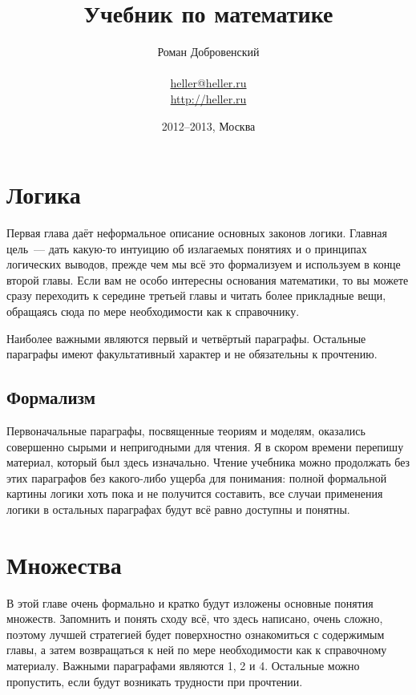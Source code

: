 \documentclass[a5paper,10pt,pagesize,DIV=classic]{scrbook}
\theoremstyle{plain}
\theoremstyle{definition}
\begin{document}
\title{Учебник по математике}
\author{Роман Добровенский\\ \\ \url{heller@heller.ru}\\ \url{http://heller.ru}}
\date{2012--2013, Москва}
\maketitle

\tableofcontents



\chapter{Логика}
Первая глава даёт неформальное описание основных законов логики. Главная цель~--- дать какую-то интуицию об излагаемых понятиях и о принципах логических выводов, прежде чем мы всё это формализуем и используем в конце второй главы. Если вам не особо интересны основания математики, то вы можете сразу переходить к середине третьей главы и читать более прикладные вещи, обращаясь сюда по мере необходимости как к справочнику.

Наиболее важными являются первый и четвёртый параграфы. Остальные параграфы имеют факультативный характер и не обязательны к прочтению.







\section{Формализм}
Первоначальные параграфы, посвященные теориям и моделям, оказались совершенно сырыми и непригодными для чтения. Я в скором времени перепишу материал, который был здесь изначально. Чтение учебника можно продолжать без этих параграфов без какого-либо ущерба для понимания: полной формальной картины логики хоть пока и не получится составить, все случаи применения логики в остальных параграфах будут всё равно доступны и понятны.





\chapter{Множества}
В этой главе очень формально и кратко будут изложены основные понятия множеств. Запомнить и понять сходу всё, что здесь написано, очень сложно, поэтому лучшей стратегией будет поверхностно ознакомиться с содержимым главы, а затем возвращаться к ней по мере необходимости как к справочному материалу. Важными параграфами являются 1, 2 и 4. Остальные можно пропустить, если будут возникать трудности при прочтении.
\end{document}
